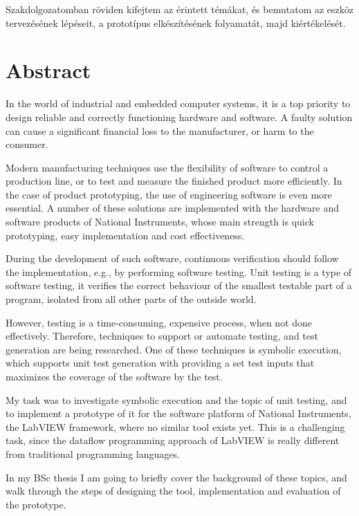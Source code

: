 Szakdolgozatomban röviden kifejtem az érintett témákat, és bemutatom az eszköz tervezésének lépéseit, a prototípus elkészítésének folyamatát, majd kiértékelését.
\vfill
\selectenglish


\chapter*{Abstract}


In the world of industrial and embedded computer systems, it is a top priority to design reliable and correctly functioning hardware and software. A faulty solution can cause a significant financial loss to the manufacturer, or harm to the consumer. 

Modern manufacturing techniques use the flexibility of software to control a production line, or to test and measure the finished product more efficiently. In the case of product prototyping, the use of engineering software is even more essential. A number of these solutions are implemented with the hardware and software products of National Instruments, whose main strength is quick prototyping, easy implementation and cost effectiveness.

During the development of such software, continuous verification should follow the implementation, e.g., by performing software testing. Unit testing is a type of software testing, it verifies the correct behaviour of the smallest testable part of a program, isolated from all other parts of the outside world.

However, testing is a time-consuming, expensive process, when not done effectively. Therefore, techniques to support or automate testing, and test generation are being researched. One of these techniques is symbolic execution, which supports unit test generation with providing a set test inputs that maximizes the coverage of the software by the test.

My task was to investigate symbolic execution and the topic of unit testing, and to implement a prototype of it for the software platform of National Instruments, the LabVIEW framework, where no similar tool exists yet. This is a challenging task, since the dataflow programming approach of LabVIEW is really different from traditional programming languages.

In my BSc thesis I am going to briefly cover the background of these topics, and walk through the steps of designing the tool, implementation and evaluation of the prototype.
\vfill
\selectthesislanguage

\setcounter{romanPage}{\value{page}}
